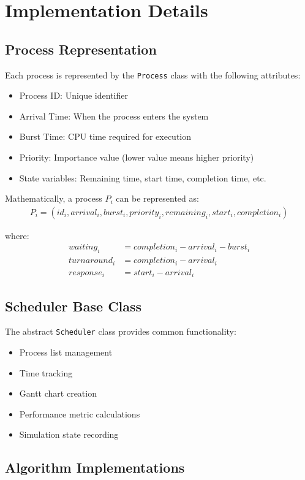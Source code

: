 \documentclass[12pt,a4paper]{report}
\begin{document}
\chapter{Implementation Details}

\section{Process Representation}
Each process is represented by the \texttt{Process} class with the following attributes:
\begin{itemize}
    \item Process ID: Unique identifier
    \item Arrival Time: When the process enters the system
    \item Burst Time: CPU time required for execution
    \item Priority: Importance value (lower value means higher priority)
    \item State variables: Remaining time, start time, completion time, etc.
\end{itemize}

Mathematically, a process $P_i$ can be represented as:
\begin{align}
P_i = (id_i, arrival_i, burst_i, priority_i, remaining_i, start_i, completion_i)
\end{align}

where:
\begin{align}
waiting_i &= completion_i - arrival_i - burst_i\\
turnaround_i &= completion_i - arrival_i\\
response_i &= start_i - arrival_i
\end{align}

\section{Scheduler Base Class}
The abstract \texttt{Scheduler} class provides common functionality:
\begin{itemize}
    \item Process list management
    \item Time tracking
    \item Gantt chart creation
    \item Performance metric calculations
    \item Simulation state recording
\end{itemize}

\section{Algorithm Implementations}
\end{document}
